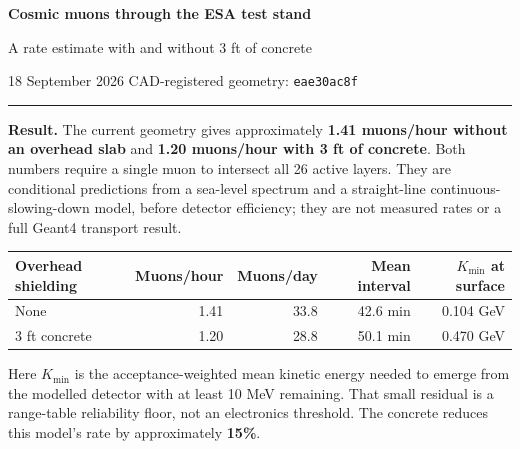 \documentclass[10pt,letterpaper]{article}
\begin{document}
{\Large\bfseries\color{navy} Cosmic muons through the ESA test stand}\par
{\large A rate estimate with and without 3 ft of concrete}\par
18 September 2026 \hfill CAD-registered geometry: \texttt{eae30ac8f}
\vspace{4pt}\hrule\vspace{7pt}

\textbf{Result.} The current geometry gives approximately \textbf{1.41 muons/hour without an overhead slab} and \textbf{1.20 muons/hour with 3 ft of concrete}. Both numbers require a single muon to intersect all 26 active layers. They are conditional predictions from a sea-level spectrum and a straight-line continuous-slowing-down model, before detector efficiency; they are not measured rates or a full Geant4 transport result.

\begin{center}
\begin{tabular}{lrrrr}
\toprule
Overhead shielding & Muons/hour & Muons/day & Mean interval & $K_{\min}$ at surface\\
\midrule
None & 1.41 & 33.8 & 42.6 min & 0.104 GeV\\
3 ft concrete & 1.20 & 28.8 & 50.1 min & 0.470 GeV\\
\bottomrule
\end{tabular}
\end{center}
Here $K_{\min}$ is the acceptance-weighted mean kinetic energy needed to emerge from the modelled detector with at least 10 MeV remaining. That small residual is a range-table reliability floor, not an electronics threshold. The concrete reduces this model's rate by approximately \textbf{15\%}.
\end{document}
